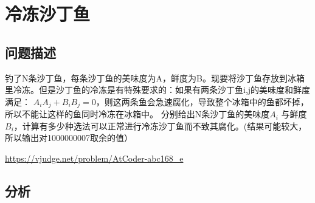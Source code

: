 \section{冷冻沙丁鱼}
\subsection{问题描述}

钓了N条沙丁鱼，每条沙丁鱼的美味度为A，鲜度为B。现要将沙丁鱼存放到冰箱里冷冻。但是沙丁鱼的冷冻是有特殊要求的：如果有两条沙丁鱼i,j的美味度和鲜度满足： \(A_iA_j+B_iB_j=0 \)，则这两条鱼会急速腐化，导致整个冰箱中的鱼都坏掉，所以不能让这样的鱼同时冷冻在冰箱中。
分别给出N条沙丁鱼的美味度\(A_i\) 与鲜度 \(B_i\)，计算有多少种选法可以正常进行冷冻沙丁鱼而不致其腐化。(结果可能较大，所以输出对1000000007取余的值） 

\url{https://vjudge.net/problem/AtCoder-abc168_e}

\subsection{分析}


